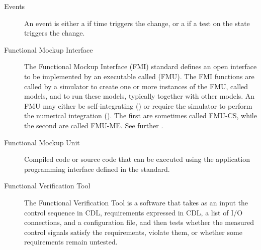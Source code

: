 \documentclass[letterpaper,10pt, openany,english]{sphinxmanual}
\begin{document}
\begin{description}
\item[{Events\label{\detokenize{glossary:term-events}}}] \leavevmode
An event is either a {\hyperref[\detokenize{glossary:term-time-event}]{}} if time triggers the change,
or a {\hyperref[\detokenize{glossary:term-state-event}]{}} if a test on the state triggers the change.

\item[{Functional Mockup Interface\label{\detokenize{glossary:term-functional-mockup-interface}}}] \leavevmode
The Functional Mockup Interface (FMI) standard defines an open interface
to be implemented by an executable called {\hyperref[\detokenize{glossary:term-functional-mockup-unit}]{}} (FMU).
The FMI functions are called by a simulator to create one or more instances of the FMU,
called models, and to run these models, typically together with other models.
An FMU may either be self-integrating ({\hyperref[\detokenize{glossary:term-co-simulation}]{}}) or require the simulator
to perform the numerical integration ({\hyperref[\detokenize{glossary:term-model-exchange}]{}}).
The first are sometimes called FMU-CS, while the second are called FMU-ME.
See further .

\item[{Functional Mockup Unit\label{\detokenize{glossary:term-functional-mockup-unit}}}] \leavevmode
Compiled code or source code that can be executed using the
application programming interface defined in the {\hyperref[\detokenize{glossary:term-functional-mockup-interface}]{}} standard.

\item[{Functional Verification Tool\label{\detokenize{glossary:term-functional-verification-tool}}}] \leavevmode
The Functional Verification Tool is a software that takes
as an input the control sequence in CDL, requirements expressed in CDL,
a list of I/O connections, and a configuration file,
and then tests whether the measured control signals
satisfy the requirements, violate them, or
whether some requirements remain untested.


\end{description}
\end{document}
